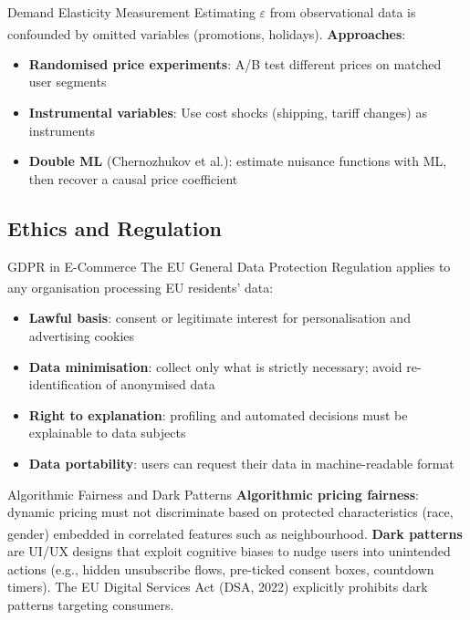 \begin{v3topic}{Demand Elasticity Measurement}
    Estimating $\varepsilon$ from observational data is confounded by omitted variables (promotions, holidays)\textsuperscript{\cite[][p.~4]{wickDemandForecastingIndividual2021}}.
    \textbf{Approaches}:
    \begin{itemize}
        \item \textbf{Randomised price experiments}: A/B test different prices on matched user segments
        \item \textbf{Instrumental variables}: Use cost shocks (shipping, tariff changes) as instruments
        \item \textbf{Double ML} (Chernozhukov et al.): estimate nuisance functions with ML, then recover a causal price coefficient
    \end{itemize}

\end{v3topic}

\subsection{Ethics and Regulation}


\begin{v3topic}{GDPR in E-Commerce}
    The EU General Data Protection Regulation applies to any organisation processing EU residents' data\textsuperscript{\cite[][pp.~25--35]{itgovernanceprivacyteamEUGDPR2020}}:
    \begin{itemize}
        \item \textbf{Lawful basis}: consent or legitimate interest for personalisation and advertising cookies
        \item \textbf{Data minimisation}: collect only what is strictly necessary; avoid re-identification of anonymised data
        \item \textbf{Right to explanation}: profiling and automated decisions must be explainable to data subjects
        \item \textbf{Data portability}: users can request their data in machine-readable format
    \end{itemize}

\end{v3topic}
\begin{v3topic}{Algorithmic Fairness and Dark Patterns}
    \textbf{Algorithmic pricing fairness}: dynamic pricing must not discriminate based on protected characteristics (race, gender) embedded in correlated features such as neighbourhood\textsuperscript{\cite[][pp.~80--85]{laudonECommerce2020}}.
    \textbf{Dark patterns} are UI/UX designs that exploit cognitive biases to nudge users into unintended actions (e.g., hidden unsubscribe flows, pre-ticked consent boxes, countdown timers).
    The EU Digital Services Act (DSA, 2022) explicitly prohibits dark patterns targeting consumers.

\end{v3topic}


